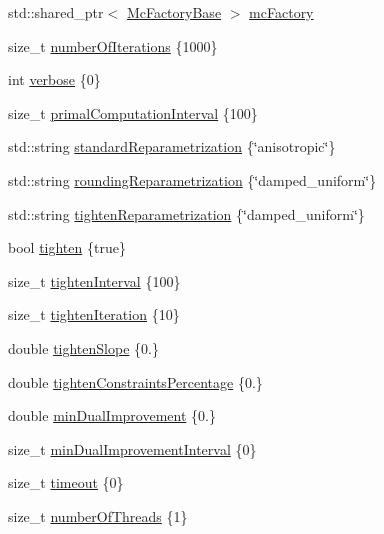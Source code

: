\begin{DoxyCompactItemize}
\item 
std\+::shared\+\_\+ptr$<$ \hyperlink{classnifty_1_1graph_1_1MulticutMp_a6da7773d133f8c60d195bf6bc42dddcd}{Mc\+Factory\+Base} $>$ \hyperlink{structnifty_1_1graph_1_1MulticutMp_1_1Settings_ac9ece5d983476b56459d50b58b61bc3a}{mc\+Factory}
\item 
size\+\_\+t \hyperlink{structnifty_1_1graph_1_1MulticutMp_1_1Settings_a3994087eb87e36ecf8b661ee035b9c51}{number\+Of\+Iterations} \{1000\}
\item 
int \hyperlink{structnifty_1_1graph_1_1MulticutMp_1_1Settings_abd9dd350bedf9464118338645a49182c}{verbose} \{0\}
\item 
size\+\_\+t \hyperlink{structnifty_1_1graph_1_1MulticutMp_1_1Settings_afcbe4c0972113d8f1bad840128418712}{primal\+Computation\+Interval} \{100\}
\item 
std\+::string \hyperlink{structnifty_1_1graph_1_1MulticutMp_1_1Settings_a9a9045813f240e40456d4bd168ca53db}{standard\+Reparametrization} \{\char`\"{}anisotropic\char`\"{}\}
\item 
std\+::string \hyperlink{structnifty_1_1graph_1_1MulticutMp_1_1Settings_a135a6729ca9b40484215cc0fc564f517}{rounding\+Reparametrization} \{\char`\"{}damped\+\_\+uniform\char`\"{}\}
\item 
std\+::string \hyperlink{structnifty_1_1graph_1_1MulticutMp_1_1Settings_a6db3ed7ee4b13dfd7f1951b1e79ff88f}{tighten\+Reparametrization} \{\char`\"{}damped\+\_\+uniform\char`\"{}\}
\item 
bool \hyperlink{structnifty_1_1graph_1_1MulticutMp_1_1Settings_a55358123a599dcfdfece677a526add9b}{tighten} \{true\}
\item 
size\+\_\+t \hyperlink{structnifty_1_1graph_1_1MulticutMp_1_1Settings_a47559659f8b97d996dbf230bab53ccc5}{tighten\+Interval} \{100\}
\item 
size\+\_\+t \hyperlink{structnifty_1_1graph_1_1MulticutMp_1_1Settings_a06d580425f31cf89c7625c6a737d63f9}{tighten\+Iteration} \{10\}
\item 
double \hyperlink{structnifty_1_1graph_1_1MulticutMp_1_1Settings_a848067bdc2e6dab77b81c37b3a08e7b8}{tighten\+Slope} \{0.\}
\item 
double \hyperlink{structnifty_1_1graph_1_1MulticutMp_1_1Settings_a42b0f297defd402eacc8d1831dd1a804}{tighten\+Constraints\+Percentage} \{0.\}
\item 
double \hyperlink{structnifty_1_1graph_1_1MulticutMp_1_1Settings_af5dce8054f85f6cb67e399ff54d06266}{min\+Dual\+Improvement} \{0.\}
\item 
size\+\_\+t \hyperlink{structnifty_1_1graph_1_1MulticutMp_1_1Settings_a4f9dfe73706bf9bcf324fd41e11b1169}{min\+Dual\+Improvement\+Interval} \{0\}
\item 
size\+\_\+t \hyperlink{structnifty_1_1graph_1_1MulticutMp_1_1Settings_ae6d8b948580badc87dab916a526760c9}{timeout} \{0\}
\item 
size\+\_\+t \hyperlink{structnifty_1_1graph_1_1MulticutMp_1_1Settings_a4a4edb7449b527ccfe09e4550054e136}{number\+Of\+Threads} \{1\}
\end{DoxyCompactItemize}


